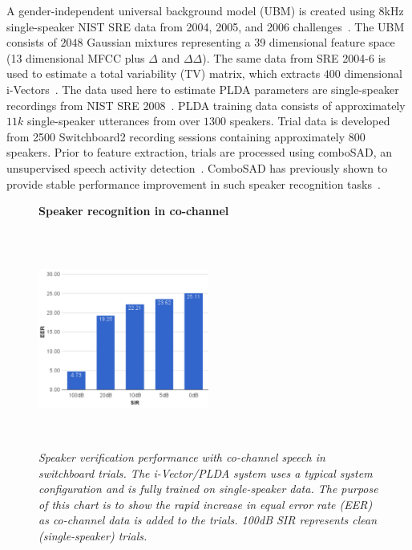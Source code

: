 A gender-independent universal background model (UBM) is created using 8kHz single-speaker NIST SRE data from 2004, 2005, and 2006 challenges~\cite{NIST04,NIST05,NIST06}. 
The UBM consists of $2048$ Gaussian mixtures representing a 39 dimensional feature space (13 dimensional MFCC plus $\Delta$ and $\Delta\Delta$). 
The same data from SRE 2004-6 is used to estimate a total variability (TV) matrix, which extracts $400$ dimensional i-Vectors~\cite{Dehak_ivector}. 
The data used here to estimate PLDA parameters are single-speaker recordings from NIST SRE 2008~\cite{NIST08}. 
PLDA training data consists of approximately $11k$ single-speaker utterances from over $1300$ speakers. 
Trial data is developed from 2500 Switchboard2 recording sessions containing approximately $800$ speakers. 
Prior to feature extraction, trials are processed using comboSAD, an unsupervised speech activity detection~\cite{sadjadi2013unsupervised}. ComboSAD has previously shown to provide stable performance improvement in such speaker recognition tasks~\cite{hasan2013crss}. 

\begin{figure}[h!]
	\centering
	\textbf{Speaker recognition in co-channel}\par\medskip
	\includegraphics[height = 2.8in, width=0.5\textwidth]{figures/eer_vs_sir_swb2_baseline}
	\vspace{-2mm}
	\caption{\it \small Speaker verification performance with co-channel speech in switchboard trials. The i-Vector/PLDA system uses a typical system configuration and is fully trained on single-speaker data. The purpose of this chart is to show the rapid increase in equal error rate (EER) as co-channel data is added to the trials. 100dB SIR represents clean (single-speaker) trials.}
	\label{fig:cch_in_sid}
	\vspace{-1mm}
\end{figure}


